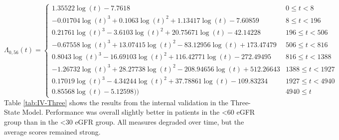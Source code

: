 \documentclass[12pt,PhD,twoside,openright]{muthesis}
\begin{document}
\begin{equation}
\Lambda_{0,56}(t)=\begin{cases} 1.35522\log(t)-7.7618 & 0 \le t < 8 \\ -0.01704\log(t)^3+0.1063\log(t)^2+1.13417\log(t)-7.60859 & 8 \le t < 196 \\ 0.21761\log(t)^3-3.6103\log(t)^2+20.75671\log(t)-42.14228 & 196 \le t < 506 \\ -0.67558\log(t)^3+13.07415\log(t)^2-83.12956\log(t)+173.47479 & 506 \le t < 816 \\ 0.8043\log(t)^3-16.69103\log(t)^2+116.42771\log(t)-272.49495 & 816 \le t < 1388 \\ -1.26732\log(t)^3+28.27738\log(t)^2-208.94656\log(t)+512.26643 & 1388 \le t < 1927 \\ 0.17019\log(t)^3-4.34244\log(t)^2+37.78861\log(t)-109.83234 & 1927 \le t < 4940 \\ 0.85568\log(t)-5.12598)) & 4940 \le t \label{eq:CH-Three-56}\end{cases}
\end{equation}
Table \ref{tab:IV-Three} shows the results from the internal validation in the Three-State Model. Performance was overall slightly better in patients in the \textless60 eGFR group than in the \textless30 eGFR group. All measures degraded over time, but the average scores remained strong.
\end{document}
